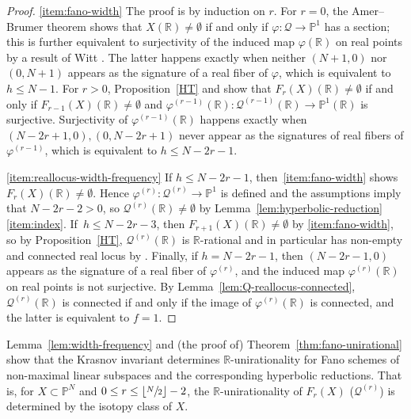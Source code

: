 \documentclass[JEP,XML,SOM,Unicode,NoEqCountersInSection,published]{cedram}
\let\cal\mathcal
\let\bb\mathbb\let\Bbb\mathbb
\theoremstyle{plain}
\theoremstyle{definition}
\let\phi\varphi
\renewcommand\P{\mathbb{P}}
\newcommand\R{\mathbb{R}}
\begin{document}
\skpt
\begin{proof}
\eqref{item:fano-width}
The proof is by induction on $r$.
For $r=0$, the Amer--Brumer theorem \cite[Th.\,2.2]{Leep} shows that
$X(\R)\neq \emptyset$ if and only if
$\phi\colon \mathcal{Q}\to \P^1$ has a section;
this is further equivalent to surjectivity of the induced map \(\phi(\bb R)\) on real points by
a result of Witt \cite[Satz 22]{witt37}.
The latter happens exactly when neither $(N+1,0)$ nor $(0,N+1)$ appears as the signature of a real fiber of $\phi$, which is equivalent to $h\leq N-1$.
For $r>0$, Proposition~\ref{HT} and \cite[Satz 22]{witt37} show that $F_r(X)(\R)\neq\emptyset$ if and only if $F_{r-1}(X)(\R)\neq\emptyset$ and $\phi^{(r-1)}(\bb R)\colon \mathcal{Q}^{(r-1)}(\bb R)\to \P^1(\bb R)$ is surjective. Surjectivity of \(\phi^{(r-1)}(\bb R)\) happens exactly when $(N-2r+1,0), (0, N-2r+1)$ never appear as the signatures of real fibers of $\phi^{(r-1)}$, which is equivalent to $h\leq N-2r-1$.

\eqref{item:reallocus-width-frequency} If $h\leq N-2r-1$, then~\eqref{item:fano-width} shows $F_r(X)(\R)\neq\emptyset$.
Hence $\phi^{(r)}\colon\mathcal{Q}^{(r)}\to \P^1$ is defined and the assumptions imply that \(N - 2r - 2 > 0\), so $\mathcal{Q}^{(r)}(\R)\neq\emptyset$ by Lemma~\ref{lem:hyperbolic-reduction}\eqref{item:index}. If~$h\leq N-2r-3$, then $F_{r+1}(X)(\R)\neq\emptyset$ by \eqref{item:fano-width}, so by Proposition~\ref{HT}, $\mathcal{Q}^{(r)}(\R)$ is $\R$-rational and in particular has non-empty and connected real locus by \cite[Th.\,13.3]{DK81}.
Finally, if $h=N-2r-1$, then $(N-2r-1,0)$ appears as the signature of a real fiber of $\phi^{(r)}$, and the induced map $\phi^{(r)}(\R)$ on real points is not surjective.
By Lemma~\ref{lem:Q-reallocus-connected}, $\mathcal{Q}^{(r)}(\R)$ is connected if and only if the image of $\phi^{(r)}(\R)$ is connected, and the latter is equivalent to $f=1$.
\end{proof}

Lemma~\ref{lem:width-frequency} and (the proof of) Theorem~\ref{thm:fano-unirational} show that the Krasnov invariant determines \(\bb R\)-unirationality for Fano schemes of non-maximal linear subspaces and the corresponding hyperbolic reductions. That is, for \(X\subset \bb P^N\) and \(0\leq r\leq \lfloor\sfrac{N}{2}\rfloor -2\), the \(\bb R\)-unirationality of $F_r(X)$ (\resp \(\cal Q^{(r)}\)) is determined by the isotopy class of \(X\).
\end{document}
